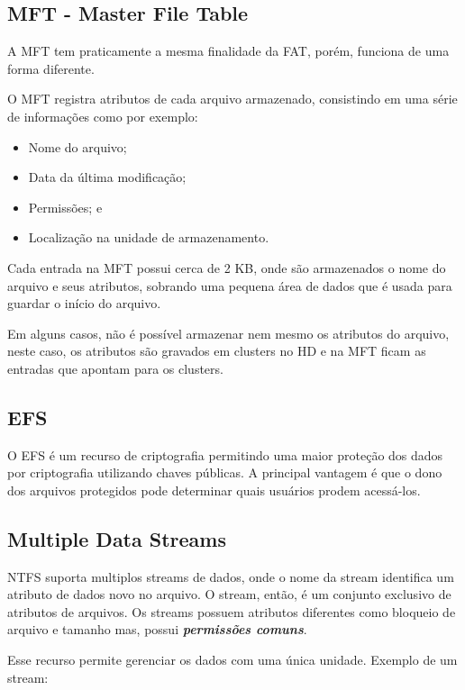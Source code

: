 \subsection{MFT - Master File Table}

A MFT tem praticamente a mesma finalidade da FAT, porém, funciona de uma forma diferente.

O MFT registra atributos de cada arquivo armazenado, consistindo em uma série de informações como por exemplo:

\begin{itemize}
	\item Nome do arquivo;
	\item Data da última modificação;
	\item Permissões; e
	\item Localização na unidade de armazenamento.
\end{itemize}

Cada entrada na MFT possui cerca de 2 KB, onde são armazenados o nome do arquivo e seus atributos, sobrando uma pequena área de dados que é usada para guardar o início do arquivo.

\begin{citacao}
  Em alguns casos, não é possível armazenar nem mesmo os atributos do arquivo, neste caso, os atributos são gravados em clusters no HD e na MFT ficam as entradas que apontam para os clusters.
\end{citacao}

\subsection{EFS}

O EFS é um recurso de criptografia permitindo uma maior proteção dos dados por criptografia utilizando chaves públicas. A principal vantagem é que o dono dos arquivos protegidos pode determinar quais usuários prodem acessá-los.

\subsection{Multiple Data Streams}

NTFS suporta multiplos streams de dados, onde o nome da stream identifica um atributo de dados novo no arquivo. O stream, então, é um conjunto exclusivo de atributos de arquivos. Os streams possuem atributos diferentes como bloqueio de arquivo e tamanho mas, possui \emph{\textbf{permissões comuns}}. 

Esse recurso permite gerenciar os dados com uma única unidade. Exemplo de um stream:

